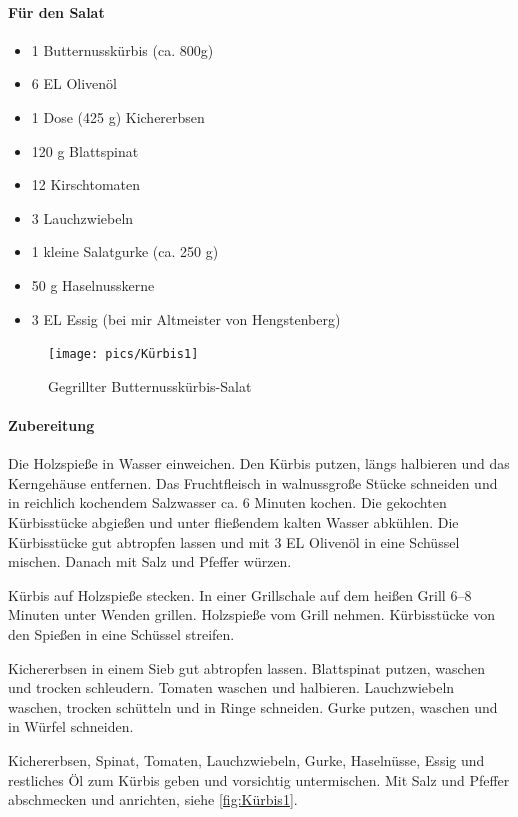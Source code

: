 \paragraph{Für den Salat}

\begin{itemize}[noitemsep]
	\item 1 Butternusskürbis (ca. 800g)
	\item 6 EL Olivenöl
	\item 1 Dose (425 g) Kichererbsen
	\item 120 g Blattspinat
	\item 12 Kirschtomaten
	\item 3 Lauchzwiebeln
	\item 1 kleine Salatgurke (ca. 250 g)
	\item 50 g Haselnusskerne
	\item 3 EL Essig (bei mir Altmeister von Hengstenberg)
\end{itemize}

\begin{figure}[htbp]
	\centering
	\texttt{[image: pics/Kürbis1]}
	\caption{Gegrillter Butternusskürbis-Salat}
	\label{fig:Kürbis1}
\end{figure}

\paragraph{Zubereitung}

Die Holzspieße in Wasser einweichen. Den Kürbis putzen, längs halbieren und 
das Kerngehäuse entfernen. Das Fruchtfleisch in walnussgroße Stücke 
schneiden
und in reichlich kochendem Salzwasser ca. 6 Minuten kochen. Die gekochten 
Kürbisstücke abgießen und unter fließendem kalten Wasser abkühlen. Die 
Kürbisstücke gut abtropfen lassen und mit 3 EL Olivenöl in eine Schüssel 
mischen. Danach mit Salz und Pfeffer würzen.

Kürbis auf Holzspieße stecken. In einer Grillschale auf dem heißen Grill 6–8 
Minuten unter Wenden grillen. Holzspieße vom Grill nehmen. Kürbisstücke von 
den 
Spießen in eine Schüssel streifen.

Kichererbsen in einem Sieb gut abtropfen lassen. Blattspinat putzen, waschen 
und trocken schleudern. Tomaten waschen und halbieren. Lauchzwiebeln 
waschen,
trocken schütteln und in Ringe schneiden. Gurke putzen, waschen und in 
Würfel schneiden.

Kichererbsen, Spinat, Tomaten, Lauchzwiebeln, Gurke, Haselnüsse, Essig und 
restliches Öl zum Kürbis geben und vorsichtig untermischen. Mit Salz und 
Pfeffer
abschmecken und anrichten, siehe \vref{fig:Kürbis1}.

